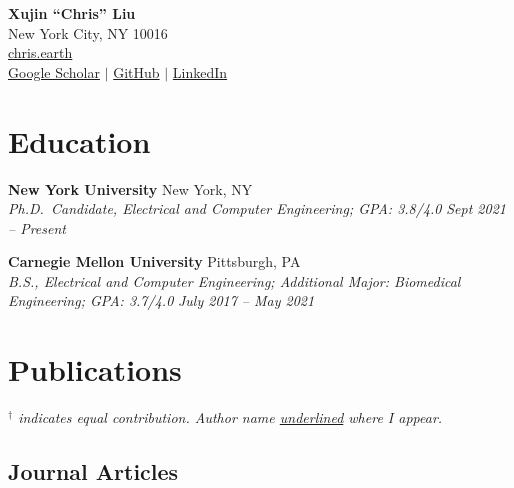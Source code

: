 \documentclass[11pt,a4paper]{article}
\newcommand{\cventry}[4]{%
  \noindent\textbf{#1} \hfill #2 \\
  \textit{#3} \hfill \textit{#4}
}
\begin{document}
\begin{center}
  {\LARGE\bfseries Xujin ``Chris'' Liu} \\[4pt]
  New York City, NY 10016 \\[2pt]
  \href{https://chris.earth}{chris.earth} \\[2pt]
  \href{https://scholar.google.com/citations?user=ZY-JsPoAAAAJ}{Google Scholar} \quad $\vert$ \quad
  \href{https://github.com/aceticia}{GitHub} \quad $\vert$ \quad
  \href{https://www.linkedin.com/in/xujin-chris-liu-6a050616b/}{LinkedIn}
\end{center}

\section{Education}

\cventry{New York University}{New York, NY}{Ph.D.\ Candidate, Electrical and Computer Engineering; GPA: 3.8/4.0}{Sept 2021 -- Present}

\vspace{8pt}

\cventry{Carnegie Mellon University}{Pittsburgh, PA}{B.S., Electrical and Computer Engineering; Additional Major: Biomedical Engineering; GPA: 3.7/4.0}{July 2017 -- May 2021}

\section{Publications}

\vspace{4pt}
\noindent\textit{$^\dagger$ indicates equal contribution. Author name \underline{underlined} where I appear.}

\vspace{6pt}

\subsection*{Journal Articles}
\end{document}
